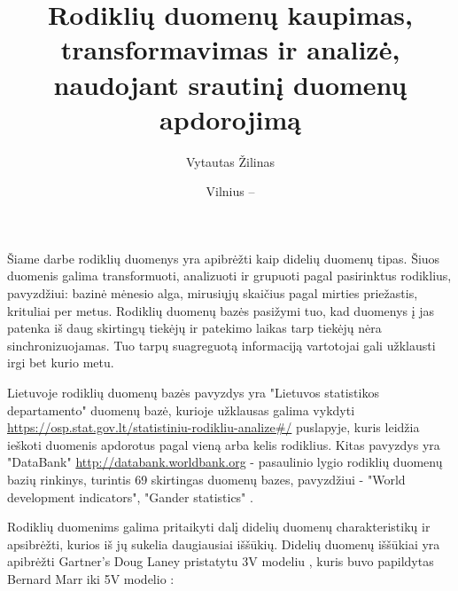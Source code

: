 \documentclass{VUMIFPSkursinis}
\title{Rodiklių duomenų kaupimas, transformavimas ir analizė, naudojant srautinį duomenų apdorojimą}
\author{Vytautas Žilinas}
\date{Vilnius – \the\year}
\begin{document}
	
\maketitle
\cleardoublepage{}
\setcounter{page}{2}

\tableofcontents


    Šiame darbe rodiklių duomenys yra apibrėžti kaip didelių duomenų tipas. Šiuos duomenis galima transformuoti, analizuoti ir grupuoti pagal pasirinktus rodiklius, 
pavyzdžiui: bazinė mėnesio alga, mirusiųjų skaičius pagal mirties priežastis, krituliai per metus. 
Rodiklių duomenų bazės pasižymi tuo, kad duomenys į jas patenka iš daug skirtingų tiekėjų ir patekimo laikas tarp
tiekėjų nėra sinchronizuojamas. Tuo tarpų suagreguotą informaciją vartotojai gali užklausti irgi bet kurio metu. \par
Lietuvoje rodiklių duomenų bazės pavyzdys yra "Lietuvos statistikos departamento" duomenų bazė, kurioje užklausas galima vykdyti
\url{https://osp.stat.gov.lt/statistiniu-rodikliu-analize#/} puslapyje, kuris leidžia ieškoti duomenis apdorotus pagal vieną arba kelis rodiklius. 
Kitas pavyzdys yra "DataBank" \url{http://databank.worldbank.org} - pasaulinio lygio rodiklių duomenų bazių rinkinys, turintis 69 skirtingas 
duomenų bazes, pavyzdžiui - "World development indicators", "Gander statistics" \cite{databank-stats}. \par
Rodiklių duomenims galima pritaikyti dalį didelių duomenų charakteristikų ir apsibrėžti, kurios iš jų sukelia daugiausiai iššūkių.
Didelių duomenų iššūkiai yra apibrėžti Gartner's Doug Laney pristatytu 3V modeliu \cite{laney20013d},
kuris buvo papildytas Bernard Marr iki 5V modelio \cite{marr2014big}:
\end{document}
